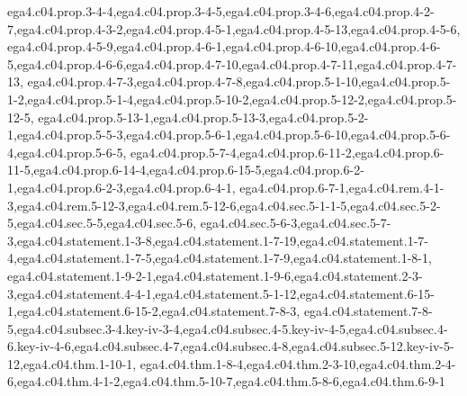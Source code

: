 {ega4.c04.prop.3-4-4,ega4.c04.prop.3-4-5,ega4.c04.prop.3-4-6,ega4.c04.prop.4-2-7,ega4.c04.prop.4-3-2,ega4.c04.prop.4-5-1,ega4.c04.prop.4-5-13,ega4.c04.prop.4-5-6,%
ega4.c04.prop.4-5-9,ega4.c04.prop.4-6-1,ega4.c04.prop.4-6-10,ega4.c04.prop.4-6-5,ega4.c04.prop.4-6-6,ega4.c04.prop.4-7-10,ega4.c04.prop.4-7-11,ega4.c04.prop.4-7-13,%
ega4.c04.prop.4-7-3,ega4.c04.prop.4-7-8,ega4.c04.prop.5-1-10,ega4.c04.prop.5-1-2,ega4.c04.prop.5-1-4,ega4.c04.prop.5-10-2,ega4.c04.prop.5-12-2,ega4.c04.prop.5-12-5,%
ega4.c04.prop.5-13-1,ega4.c04.prop.5-13-3,ega4.c04.prop.5-2-1,ega4.c04.prop.5-5-3,ega4.c04.prop.5-6-1,ega4.c04.prop.5-6-10,ega4.c04.prop.5-6-4,ega4.c04.prop.5-6-5,%
ega4.c04.prop.5-7-4,ega4.c04.prop.6-11-2,ega4.c04.prop.6-11-5,ega4.c04.prop.6-14-4,ega4.c04.prop.6-15-5,ega4.c04.prop.6-2-1,ega4.c04.prop.6-2-3,ega4.c04.prop.6-4-1,%
ega4.c04.prop.6-7-1,ega4.c04.rem.4-1-3,ega4.c04.rem.5-12-3,ega4.c04.rem.5-12-6,ega4.c04.sec.5-1-1-5,ega4.c04.sec.5-2-5,ega4.c04.sec.5-5,ega4.c04.sec.5-6,%
ega4.c04.sec.5-6-3,ega4.c04.sec.5-7-3,ega4.c04.statement.1-3-8,ega4.c04.statement.1-7-19,ega4.c04.statement.1-7-4,ega4.c04.statement.1-7-5,ega4.c04.statement.1-7-9,ega4.c04.statement.1-8-1,%
ega4.c04.statement.1-9-2-1,ega4.c04.statement.1-9-6,ega4.c04.statement.2-3-3,ega4.c04.statement.4-4-1,ega4.c04.statement.5-1-12,ega4.c04.statement.6-15-1,ega4.c04.statement.6-15-2,ega4.c04.statement.7-8-3,%
ega4.c04.statement.7-8-5,ega4.c04.subsec.3-4.key-iv-3-4,ega4.c04.subsec.4-5.key-iv-4-5,ega4.c04.subsec.4-6.key-iv-4-6,ega4.c04.subsec.4-7,ega4.c04.subsec.4-8,ega4.c04.subsec.5-12.key-iv-5-12,ega4.c04.thm.1-10-1,%
ega4.c04.thm.1-8-4,ega4.c04.thm.2-3-10,ega4.c04.thm.2-4-6,ega4.c04.thm.4-1-2,ega4.c04.thm.5-10-7,ega4.c04.thm.5-8-6,ega4.c04.thm.6-9-1%
}

